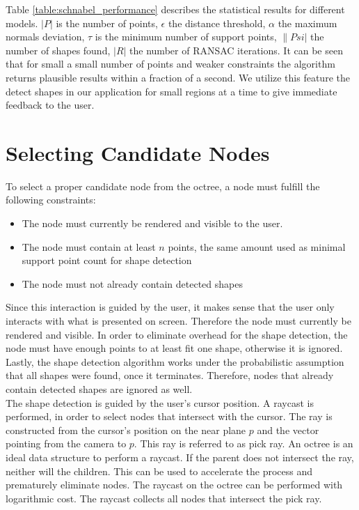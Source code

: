 Table \ref{table:schnabel_performance} describes the statistical results for different models. $|P|$ is the number of points, $\epsilon$ the distance threshold, $\alpha$ the maximum normals deviation, $\tau$ is the minimum number of support points, $\|Psi|$ the number of shapes found, $|R|$ the number of RANSAC iterations. It can be seen that for small a small number of points and weaker constraints the algorithm returns plausible results within a fraction of a second. We utilize this feature the detect shapes in our application for small regions at a time to give immediate feedback to the user. 


\section{Selecting Candidate Nodes}
\label{sec:candidateNodes}
To select a proper candidate node from the octree, a node must fulfill the following constraints: 
\begin{itemize}
	\item The node must currently be rendered and visible to the user. 
	\item The node must contain at least $n$ points, the same amount used as minimal support point count for shape detection
	\item The node must not already contain detected shapes
\end{itemize}

Since this interaction is guided by the user, it makes sense that the user only interacts with what is presented on screen. Therefore the node must currently be rendered and visible. In order to eliminate overhead for the shape detection, the node must have enough points to at least fit one shape, otherwise it is ignored. Lastly, the shape detection algorithm works under the probabilistic assumption that all shapes were found, once it terminates. Therefore, nodes that already contain detected shapes are ignored as well. 
\\
The shape detection is guided by the user's cursor position. 
A raycast is performed, in order to select nodes that intersect with the cursor. 
The ray is constructed from the cursor's position on the near plane $p$ and the vector pointing from the camera to $p$. This ray is referred to as pick ray. 
An octree is an ideal data structure to perform a raycast. If the parent does not intersect the ray, neither will the children. This can be used to accelerate the process and prematurely eliminate nodes. The raycast on the octree can be performed with logarithmic cost. The raycast collects all nodes that intersect the pick ray. 


